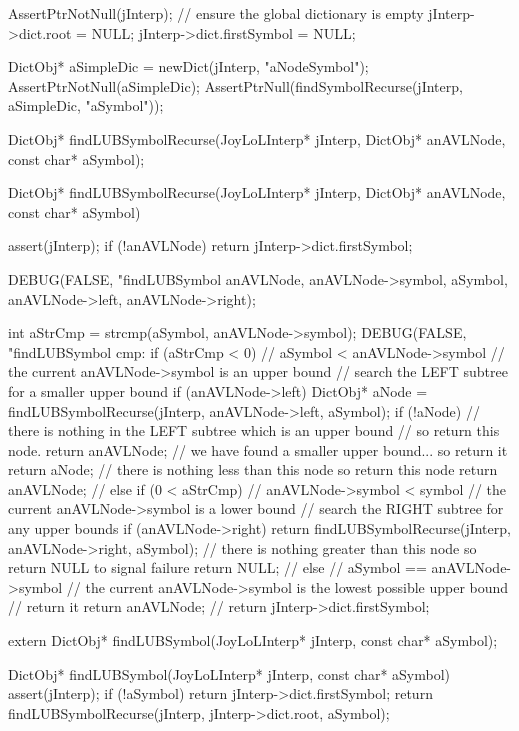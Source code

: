 \startCTest
  AssertPtrNotNull(jInterp);
  // ensure the global dictionary is empty
  jInterp->dict.root        = NULL;
  jInterp->dict.firstSymbol = NULL;

  DictObj* aSimpleDic = newDict(jInterp, "aNodeSymbol");
  AssertPtrNotNull(aSimpleDic);
  AssertPtrNull(findSymbolRecurse(jInterp, aSimpleDic, "aSymbol"));
\stopCTest
\stopTestCase
\stopTestSuite

\startCHeader
DictObj* findLUBSymbolRecurse(JoyLoLInterp* jInterp,
                              DictObj* anAVLNode,
                              const char* aSymbol);
\stopCHeader
{}

\startCCode
DictObj* findLUBSymbolRecurse(JoyLoLInterp* jInterp,
                              DictObj* anAVLNode,
                              const char* aSymbol) {
  assert(jInterp);
  if (!anAVLNode) return jInterp->dict.firstSymbol;

  DEBUG(FALSE, "findLUBSymbol %
        anAVLNode, anAVLNode->symbol, aSymbol,
        anAVLNode->left, anAVLNode->right);

  int aStrCmp = strcmp(aSymbol, anAVLNode->symbol);
  DEBUG(FALSE, "findLUBSymbol cmp: %
  if (aStrCmp < 0) {
    // aSymbol < anAVLNode->symbol
    // the current anAVLNode->symbol is an upper bound
    // search the LEFT subtree for a smaller upper bound
    if (anAVLNode->left) {
      DictObj* aNode = findLUBSymbolRecurse(jInterp, anAVLNode->left, aSymbol);
      if (!aNode) {
        // there is nothing in the LEFT subtree which is an upper bound
        // so return this node.
        return anAVLNode;
      }
      // we have found a smaller upper bound... so return it
      return aNode;
    }
    // there is nothing less than this node so return this node
    return anAVLNode;
    //
  } else if (0 < aStrCmp) {
    // anAVLNode->symbol < symbol
    // the current anAVLNode->symbol is a lower bound
    // search the RIGHT subtree for any upper bounds
    if (anAVLNode->right) {
      return findLUBSymbolRecurse(jInterp, anAVLNode->right, aSymbol);
    }
    // there is nothing greater than this node so return NULL to signal failure
    return NULL;
    //
  } else {
    // aSymbol == anAVLNode->symbol
    // the current anAVLNode->symbol is the lowest possible upper bound
    // return it
    return anAVLNode;
    //
  }
  return jInterp->dict.firstSymbol;
}
\stopCCode

\startCHeader
extern DictObj* findLUBSymbol(JoyLoLInterp* jInterp, const char* aSymbol);
\stopCHeader

\startCCode
DictObj* findLUBSymbol(JoyLoLInterp* jInterp, const char* aSymbol) {
  assert(jInterp);
  if (!aSymbol) return jInterp->dict.firstSymbol;
  return findLUBSymbolRecurse(jInterp, jInterp->dict.root, aSymbol);
}
\stopCCode
